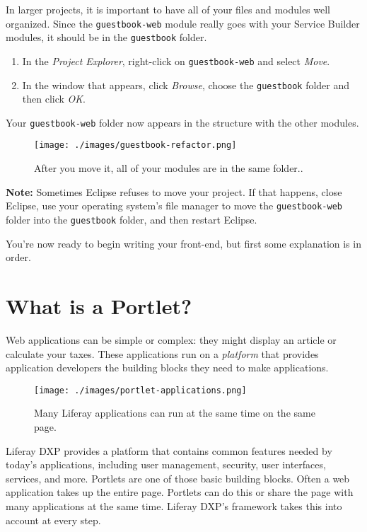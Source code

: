 In larger projects, it is important to have all of your files and
modules well organized. Since the \texttt{guestbook-web} module really
goes with your Service Builder modules, it should be in the
\texttt{guestbook} folder.

\begin{enumerate}
\def\labelenumi{\arabic{enumi}.}
\item
  In the \emph{Project Explorer}, right-click on \texttt{guestbook-web}
  and select \emph{Move}.
\item
  In the window that appears, click \emph{Browse}, choose the
  \texttt{guestbook} folder and then click \emph{OK}.
\end{enumerate}

Your \texttt{guestbook-web} folder now appears in the structure with the
other modules.

\begin{figure}
\centering
\texttt{[image: ./images/guestbook-refactor.png]}
\caption{After you move it, all of your modules are in the same
folder..}
\end{figure}

\noindent\hrulefill

\textbf{Note:} Sometimes Eclipse refuses to move your project. If that
happens, close Eclipse, use your operating system's file manager to move
the \texttt{guestbook-web} folder into the \texttt{guestbook} folder,
and then restart Eclipse.

\noindent\hrulefill

You're now ready to begin writing your front-end, but first some
explanation is in order.

\section{What is a Portlet?}\label{what-is-a-portlet}

Web applications can be simple or complex: they might display an article
or calculate your taxes. These applications run on a \emph{platform}
that provides application developers the building blocks they need to
make applications.

\begin{figure}
\centering
\texttt{[image: ./images/portlet-applications.png]}
\caption{Many Liferay applications can run at the same time on the same
page.}
\end{figure}

Liferay DXP provides a platform that contains common features needed by
today's applications, including user management, security, user
interfaces, services, and more. Portlets are one of those basic building
blocks. Often a web application takes up the entire page. Portlets can
do this or share the page with many applications at the same time.
Liferay DXP's framework takes this into account at every step.

